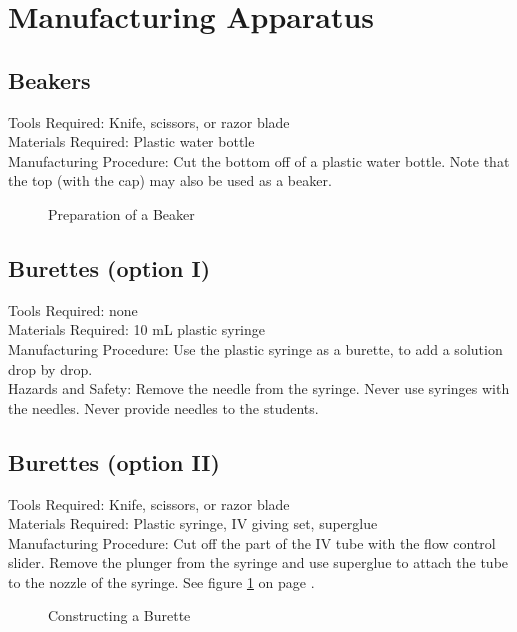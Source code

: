 \section{Manufacturing Apparatus}

\subsection*{Beakers}
Tools Required: Knife, scissors, or razor blade\\
Materials Required: Plastic water bottle\\
Manufacturing Procedure: Cut the bottom off of a plastic water bottle. Note that the top (with the cap) may also be used as a beaker.
\begin{figure}[h]
\begin{center}
\def\svgwidth{200pt}

\caption{Preparation of a Beaker}

\end{center}
\end{figure}

\subsection*{Burettes (option I)}
Tools Required: none\\
Materials Required: 10 mL plastic syringe\\
Manufacturing Procedure: Use the plastic syringe as a burette, to add a solution drop by drop.
\\Hazards and Safety: Remove the needle from the syringe. Never use syringes with the needles. Never provide needles to the students.

\subsection*{Burettes (option II)}
Tools Required: Knife, scissors, or razor blade\\
Materials Required: Plastic syringe, IV giving set, superglue\\
Manufacturing Procedure: Cut off the part of the IV tube with the flow control slider. Remove the plunger from the syringe and use superglue to attach the tube to the nozzle of the syringe. See figure \ref{fig:burette} on page \pageref{fig:burette}.


\begin{figure}[h]
\begin{center}
\caption{Constructing a Burette}
\label{fig:burette}
\end{center}
\end{figure}

